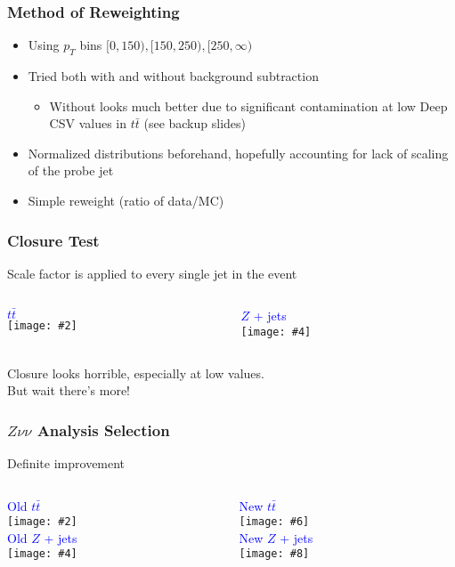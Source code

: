 \documentclass{beamer}
\newcommand{\twofigs}[4]{
  \begin{columns}
    \begin{column}{0.5\linewidth}
      \centering
      \textcolor{blue}{#1} \\
      \texttt{[image: \#2]}
    \end{column}
    \begin{column}{0.5\linewidth}
      \centering
      \textcolor{blue}{#3} \\
      \texttt{[image: \#4]}
    \end{column}
  \end{columns}
}
\newcommand{\fourfigs}[8]{
  \begin{columns}
    \begin{column}{0.3\linewidth}
      \centering
      \textcolor{blue}{#1} \\
      \texttt{[image: \#2]} \\
      \textcolor{blue}{#3} \\
      \texttt{[image: \#4]}
    \end{column}
    \begin{column}{0.3\linewidth}
      \centering
      \textcolor{blue}{#5} \\
      \texttt{[image: \#6]} \\
      \textcolor{blue}{#7} \\
      \texttt{[image: \#8]}
    \end{column}
  \end{columns}
}
\newcommand{\ttbar}{\ensuremath{t\bar{t}}}
\begin{document}
\begin{frame}
  \frametitle{Method of Reweighting}

  \begin{itemize}
  \item Using $p_T$ bins $[0, 150), [150, 250), [250, \infty)$
  \item Tried both with and without background subtraction
    \begin{itemize}
    \item Without looks much better due to significant contamination
      at low Deep CSV values in $\ttbar$ (see backup slides)
    \end{itemize}
  \item Normalized distributions beforehand,
    hopefully accounting for lack of scaling of the probe jet
  \item Simple reweight (ratio of data/MC)
  \end{itemize}

\end{frame}

\begin{frame}
  \frametitle{Closure Test}

  Scale factor is applied to every single jet in the event

  \twofigs{\ttbar}
          {190215_closure/tt_jet2_deepCSVb.pdf}
          {$Z$ + jets}
          {190215_closure/z_jet2_deepCSVb.pdf}

  Closure looks horrible, especially at low values. \\ But wait there's more!

\end{frame}

\begin{frame}
  \frametitle{$Z\nu\nu$ Analysis Selection}

  Definite improvement

  \fourfigs{Old \ttbar}
           {190219_olddeep/tt_jet2_deepCSVb.pdf}
           {Old $Z$ + jets}
           {190219_olddeep/heavyz_jet2_deepCSVb.pdf}
           {New \ttbar}
           {190219_newdeep/tt_jet2_deepCSVb.pdf}
           {New $Z$ + jets}
           {190219_newdeep/heavyz_jet2_deepCSVb.pdf}

\end{frame}
\end{document}
